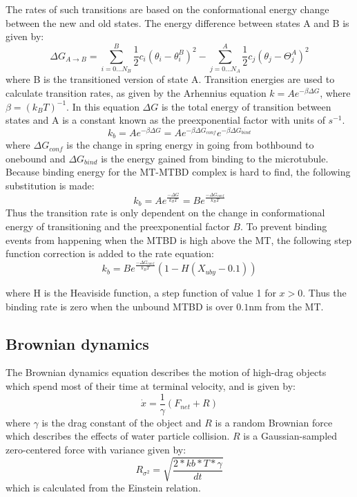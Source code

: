 \documentclass[
11pt, %
english, %
singlespacing, %
headsepline, %
chapterinoneline, %
]{MastersDoctoralThesis} %
\begin{document}
The rates of such transitions are based on the conformational energy change between the new and old states. The energy difference between states A and B is given by:
%
\begin{equation}
  \Delta G_{A\rightarrow B} = \sum_{i=0...N_B}^{B} \frac{1}{2}c_i\left(\theta_i-\theta_i^B\right)^2 - \sum_{j=0...N_A}^{A} \frac{1}{2}c_j\left(\theta_j-\Theta_j^A\right)^2
\end{equation}
%
where B is the transitioned version of state A. Transition energies are used to calculate transition rates, as given by the Arhennius equation $k=Ae^{-\beta\Delta G}$, where $\beta = (k_BT)^{-1}$. In this equation $\Delta G$ is the total energy of transition between states and A is a constant known as the preexponential factor with units of $s^{-1}$.\\
%
\begin{equation}
  k_b = Ae^{-\beta\Delta G} = Ae^{-\beta\Delta G_{conf}}e^{-\beta\Delta G_{bind}}
\end{equation}
%
where $\Delta G_{conf}$ is the change in spring energy in going from bothbound to onebound and $\Delta G_{bind}$ is the energy gained from binding to the microtubule. Because binding energy for the MT-MTBD complex is hard to find, the following substitution is made:
%
\begin{equation}
  k_b = Ae^{\frac{-\Delta G}{k_BT}} = Be^{\frac{-\Delta G_{conf}}{k_BT}}
\end{equation}
%
Thus the transition rate is only dependent on the change in conformational energy of transitioning and the preexponential factor $B$. To prevent binding events from happening when the MTBD is high above the MT, the following step function correction is added to the rate equation: \\

\begin{equation}
  k_b = Be^{\frac{-\Delta G_{conf}}{k_BT}}\left(1-H\left(X_{uby}-0.1\right)\right)
\end{equation}

where H is the Heaviside function, a step function of value 1 for $x>0$. Thus the binding rate is zero when the unbound MTBD is over $0.1$nm from the MT.\\

\subsection{Brownian dynamics}
\label{sec:bd}
The Brownian dynamics equation describes the motion of high-drag objects which spend most of their time at terminal velocity, and is given by:
%
\begin{equation}
  \dot{x} = \frac{1}{\gamma}\left(F_{net} + R\right)
\end{equation}
%
where $\gamma$ is the drag constant of the object and $R$ is a random Brownian force which describes the effects of water particle collision. $R$ is a Gaussian-sampled zero-centered force with variance given by:
%
\begin{equation}
  R_{\sigma^2} = \sqrt{\frac{2*kb*T*\gamma}{dt}}
\end{equation}
%
which is calculated from the Einstein relation.\\
\end{document}
